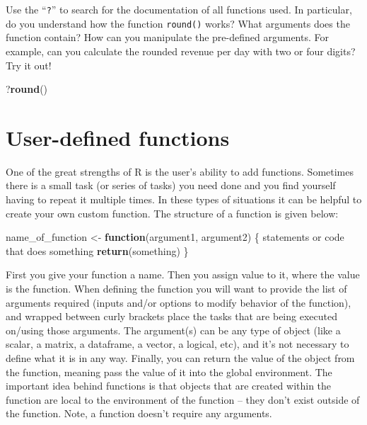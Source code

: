 \documentclass[
  12pt,
  oneside]{book}
\newenvironment{Shaded}{\begin{snugshade}}{\end{snugshade}}
\newcommand{\ControlFlowTok}[1]{\textcolor[rgb]{0.13,0.29,0.53}{\textbf{#1}}}
\newcommand{\FunctionTok}[1]{\textcolor[rgb]{0.13,0.29,0.53}{\textbf{#1}}}
\newcommand{\NormalTok}[1]{#1}
\newcommand{\OtherTok}[1]{\textcolor[rgb]{0.56,0.35,0.01}{#1}}
\theoremstyle{definition}
\theoremstyle{definition}
\theoremstyle{definition}
\theoremstyle{definition}
\theoremstyle{remark}
\begin{document}
Use the ``\texttt{?}'' to search for the documentation of all functions used. In particular, do you understand how the function \texttt{round()} works? What arguments does the function contain? How can you manipulate the pre-defined arguments. For example, can you calculate the rounded revenue per day with two or four digits? Try it out!

\begin{Shaded}
\begin{Highlighting}[]
\NormalTok{?}\FunctionTok{round}\NormalTok{()}
\end{Highlighting}
\end{Shaded}

\hypertarget{sec:generics}{%
\section{User-defined functions}\label{sec:generics}}

One of the great strengths of R is the user's ability to add functions. Sometimes there is a small task (or series of tasks) you need done and you find yourself having to repeat it multiple times. In these types of situations it can be helpful to create your own custom function. The structure of a function is given below:

\begin{Shaded}
\begin{Highlighting}[]
\NormalTok{name\_of\_function }\OtherTok{\textless{}{-}} \ControlFlowTok{function}\NormalTok{(argument1, argument2) \{}
\NormalTok{    statements or code that does something}
    \FunctionTok{return}\NormalTok{(something)}
\NormalTok{\}}
\end{Highlighting}
\end{Shaded}

First you give your function a name.
Then you assign value to it, where the value is the function.
When defining the function you will want to provide the list of arguments required (inputs and/or options to modify behavior of the function), and wrapped between curly brackets place the tasks that are being executed on/using those arguments. The argument(s) can be any type of object (like a scalar, a matrix, a dataframe, a vector, a logical, etc), and it's not necessary to define what it is in any way.
Finally, you can return the value of the object from the function, meaning pass the value of it into the global environment. The important idea behind functions is that objects that are created within the function are local to the environment of the function -- they don't exist outside of the function. Note, a function doesn't require any arguments.
\end{document}
